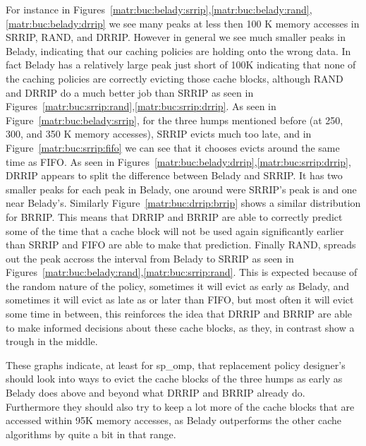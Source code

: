 For instance in Figures~\ref{matr:buc:belady:srrip},\ref{matr:buc:belady:rand},\ref{matr:buc:belady:drrip} we see many peaks at less then 100 K memory accesses in SRRIP, RAND, and DRRIP.
However in general we see much smaller peaks in Belady, indicating that our caching policies are holding onto the wrong data.
In fact Belady has a relatively large peak just short of 100K indicating that none of the caching policies are correctly evicting those cache blocks,
 although RAND and DRRIP do a much better job than SRRIP as seen in Figures~\ref{matr:buc:srrip:rand},\ref{matr:buc:srrip:drrip}.
As seen in Figure~\ref{matr:buc:belady:srrip}, for the three humps mentioned before (at 250, 300, and 350 K memory accesses),
 SRRIP evicts much too late, and in Figure~\ref{matr:buc:srrip:fifo} we can see that it chooses evicts around the same time as FIFO.
As seen in Figures~\ref{matr:buc:belady:drrip},\ref{matr:buc:srrip:drrip}, DRRIP appears to split the difference between Belady and SRRIP.
It has two smaller peaks for each peak in Belady, one around were SRRIP's peak is and one near Belady's.
Similarly Figure~\ref{matr:buc:drrip:brrip} shows a similar distribution for BRRIP.
This means that DRRIP and BRRIP are able to correctly predict some of the time that a cache block will not be used again significantly earlier than SRRIP and FIFO are able to make that prediction.
Finally RAND, spreads out the peak accross the interval from Belady to SRRIP as seen in Figures~\ref{matr:buc:belady:rand},\ref{matr:buc:srrip:rand}.
This is expected because of the random nature of the policy, sometimes it will evict as early as Belady, and sometimes it will evict as late as or later than FIFO,
 but most often it will evict some time in between, this reinforces the idea that DRRIP and BRRIP are able to make informed decisions about these cache blocks,
 as they, in contrast show a trough in the middle.

These graphs indicate, at least for sp\_omp, that replacement policy designer's should look into ways
 to evict the cache blocks of the three humps as early as Belady does above and beyond what DRRIP and BRRIP already do.
Furthermore they should also try to keep a lot more of the cache blocks that are accessed within 95K memory accesses,
 as Belady outperforms the other cache algorithms by quite a bit in that range.

